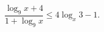 \begin{ex}[type=inequality]
	\begin{condition}
		$\dfrac{\log_9 x + 4}{1+ \log_9 x}\leqslant4\log_x 3 - 1  .$
	\end{condition}
\end{ex}